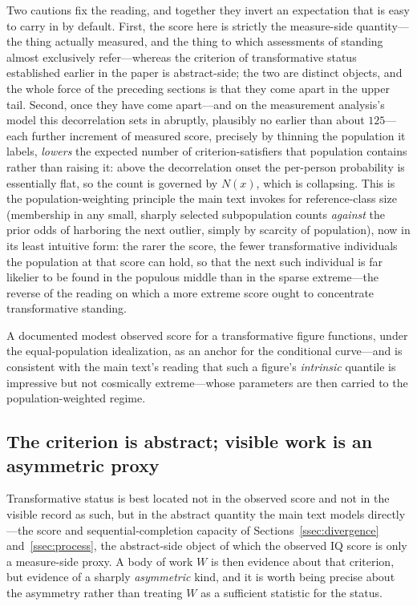 \documentclass{article}
\begin{document}
Two cautions fix the reading, and together they invert an expectation that is easy to carry in by default. First, the score here is strictly the measure-side quantity---the thing actually measured, and the thing to which assessments of standing almost exclusively refer---whereas the criterion of transformative status established earlier in the paper is abstract-side; the two are distinct objects, and the whole force of the preceding sections is that they come apart in the upper tail. Second, once they have come apart---and on the measurement analysis's model this decorrelation sets in abruptly, plausibly no earlier than about $125$---each further increment of measured score, precisely by thinning the population it labels, \emph{lowers} the expected number of criterion-satisfiers that population contains rather than raising it: above the decorrelation onset the per-person probability is essentially flat, so the count is governed by $N(x)$, which is collapsing. This is the population-weighting principle the main text invokes for reference-class size (membership in any small, sharply selected subpopulation counts \emph{against} the prior odds of harboring the next outlier, simply by scarcity of population), now in its least intuitive form: the rarer the score, the fewer transformative individuals the population at that score can hold, so that the next such individual is far likelier to be found in the populous middle than in the sparse extreme---the reverse of the reading on which a more extreme score ought to concentrate transformative standing.

A documented modest observed score for a transformative figure functions, under the equal-population idealization, as an anchor for the conditional curve---and is consistent with the main text's reading that such a figure's \emph{intrinsic} quantile is impressive but not cosmically extreme---whose parameters are then carried to the population-weighted regime.

\subsection{The criterion is abstract; visible work is an asymmetric proxy}\label{app:screen}
Transformative status is best located not in the observed score and not in the visible record as such, but in the abstract quantity the main text models directly---the score and sequential-completion capacity of Sections~\ref{ssec:divergence} and~\ref{ssec:process}, the abstract-side object of which the observed IQ score is only a measure-side proxy. A body of work $W$ is then evidence about that criterion, but evidence of a sharply \emph{asymmetric} kind, and it is worth being precise about the asymmetry rather than treating $W$ as a sufficient statistic for the status.
\end{document}
